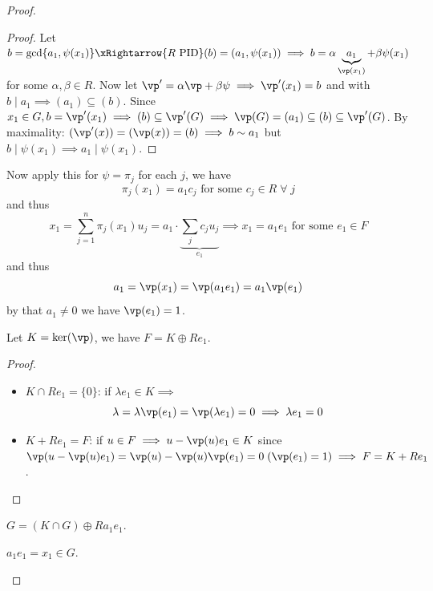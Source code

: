 \begin{proof}
\begin{enumerate}
		      \begin{proof}
			      Let \( b = \gcd\{a_1,\psi(x_1)\}  \xRightarrow{ R \text{ PID}} (b) = (a_1, \psi(x_1)) \implies b = \alpha \underbrace{a_1}_{\vp(x_1)} + \beta
			      \psi(x_1)\) for some \( \alpha, \beta \in R \). Now let \( \vp' = \alpha \vp + \beta \psi
			      \implies \vp'(x_1) = b\) and with \( b \mid a_1 \implies (a_1) \subseteq (b)
			      \). Since \( x_1 \in G, b = \vp'(x_1) \implies (b) \subseteq \vp'(G) \implies \vp(G) = (a_1) \subseteq (b) \subseteq \vp'(G) \). By maximality: \( (\vp'(x))  = (\vp(x)) = (b) \implies b \sim a_1\) but \( b \mid
			      \psi(x_1) \implies a_1 \mid \psi(x_1)\).
		      \end{proof}
		      Now apply this for \( \psi = \pi_j \) for each \( j \), we have
		      \[
			      \pi_j (x_1) = a_1 c_j \text{ for some } c_j \in R \; \forall \; j
		      \]
		      and thus
		      \[
			      x_1 = \sum_{j=1}^n \pi_j (x_1) u_j = a_1 \cdot \underbrace{\sum_{j} c_j u_j}_{e_1}
			      \implies x_1 = a_1 e_1 \text{ for some } e_1 \in F
		      \]
		      and thus
		      \[
			      a_1 = \vp(x_1) = \vp(a_1 e_1) = a_1 \vp(e_1)
		      \]
		      by that \( a_1\ne 0 \) we have \( \vp(e_1) = 1 \).

		      \begin{claim}
			      Let \( K = \ker(\vp) \), we have \( F = K \oplus R e_1 \).
		      \end{claim}

		      \begin{proof}
			      \leavevmode
			      \begin{itemize}
				      \item \( K \cap R e_1 = \{0\} \): if \( \lambda e_1 \in K \implies \)
				            \[
					            \lambda = \lambda \vp(e_1) = \vp(\lambda e_1) = 0 \implies \lambda e_1 = 0
				            \]
				      \item \( K + Re_1 = F \): if \( u \in F \implies u - \vp(u)e_1 \in K \) since \(
				            \vp(u - \vp(u) e_1) = \vp(u) - \vp(u)\vp(e_1) = 0 \; (\vp(e_1) = 1) \implies F = K + Re_1 \).
			      \end{itemize}
		      \end{proof}

		      \begin{claim}
			      \( G = (K \cap G) \oplus R a_1 e_1 \).
			      \begin{note}
				      \( a_1 e_1 = x_1 \in G \).
			      \end{note}
		      \end{claim}


\end{enumerate}
\end{proof}
